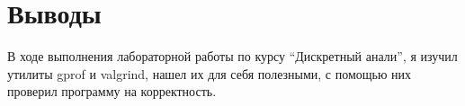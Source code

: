 \section{Выводы}
В ходе выполнения лабораторной работы по курсу \enquote{Дискретный анали}, я изучил утилиты gprof и valgrind, нашел их для себя полезными, с помощью них проверил программу на корректность.
\pagebreak
